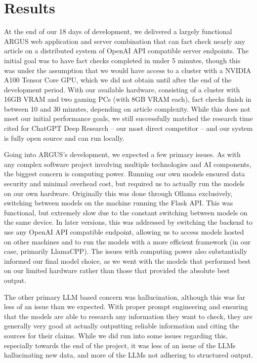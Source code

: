 \documentclass[conference]{IEEEtran}
\begin{document}
\section{Results}
At the end of our 18 days of development, we delivered a largely functional ARGUS web application and server combination that can fact check nearly any article on a distributed system of OpenAI API compatible server endpoints. The initial goal was to have fact checks completed in under 5 minutes, though this was under the assumption that we would have access to a cluster with a NVIDIA A100 Tensor Core GPU, which we did not obtain until after the end of the development period. With our available hardware, consisting of a cluster with 16GB VRAM and two gaming PCs (with 8GB VRAM each), fact checks finish in between 10 and 30 minutes, depending on article complexity. While this does not meet our initial performance goals, we still successfully matched the research time cited for ChatGPT Deep Research -- our most direct competitor -- and our system is fully open source and can run locally.

Going into ARGUS's development, we expected a few primary issues. As with any complex software project involving multiple technologies and AI components, the biggest concern is computing power. Running our own models ensured data security and minimal overhead cost, but required us to actually run the models on our own hardware. Originally this was done through Ollama exclusively, switching between models on the machine running the Flask API. This was functional, but extremely slow due to the constant switching between models on the same device. In later versions, this was addressed by switching the backend to use any OpenAI API compatible endpoint, allowing us to access models hosted on other machines and to run the models with a more efficient framework (in our case, primarily LlamaCPP). The issues with computing power also substantially informed our final model choice, as we went with the models that performed best on our limited hardware rather than those that provided the absolute best output.

The other primary LLM based concern was hallucination, although this was far less of an issue than we expected. With proper prompt engineering and ensuring that the models are able to research any information they want to check, they are generally very good at actually outputting reliable information and citing the sources for their claims. While we did run into some issues regarding this, especially towards the end of the project, it was less of an issue of the LLMs hallucinating new data, and more of the LLMs not adhering to structured output.
\end{document}
